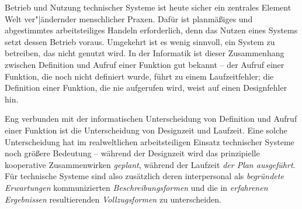 \documentclass[11pt,a4paper]{article}
\begin{document}
Betrieb und Nutzung technischer Systeme ist heute sicher ein zentrales Element
Welt ver"|ändernder menschlicher Praxen. Dafür ist planmäßiges und abgestimmtes
arbeitsteiliges Handeln erforderlich, denn das Nutzen eines Systems setzt
dessen Betrieb voraus.  Umgekehrt ist es wenig sinnvoll, ein System zu
betreiben, das nicht genutzt wird. In der Informatik ist dieser Zusammenhang
zwischen Definition und Aufruf einer Funktion gut bekannt -- der Aufruf einer
Funktion, die noch nicht definiert wurde, führt zu einem Laufzeitfehler; die
Definition einer Funktion, die nie aufgerufen wird, weist auf einen
Designfehler hin.

Eng verbunden mit der informatischen Unterscheidung von Definition und Aufruf
einer Funktion ist die Unterscheidung von Designzeit und Laufzeit.  Eine
solche Unterscheidung hat im realweltlichen arbeitsteiligen Einsatz
technischer Systeme noch größere Bedeutung -- während der Designzeit wird das
prinzipielle kooperative Zusammenwirken \emph{geplant}, während der Laufzeit
\emph{der Plan ausgeführt}. Für technische Systeme sind also zusätzlich deren
interpersonal als \emph{begründete Erwartungen} kommunizierten
\emph{Beschreibungsformen} und die in \emph{erfahrenen Ergebnissen}
resultierenden \emph{Vollzugsformen} zu unterscheiden.
\end{document}
